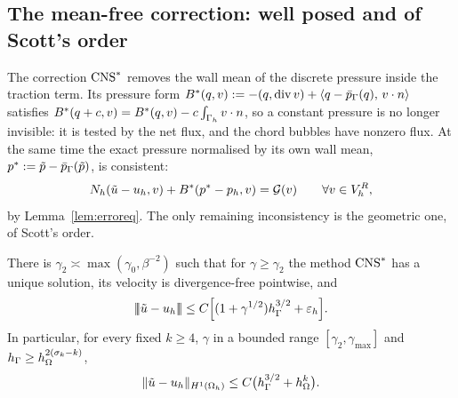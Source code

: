 \subsection{The mean-free correction: well posed and of Scott's order}
The correction $\mathrm{CNS}^\ast$ removes the wall mean of the discrete pressure inside the traction term. Its pressure form $B^\ast(q,v):=-(q,\operatorname{div} v)+\langle q-\bar p_{\Gamma}(q),\, v\cdot n\rangle$ satisfies $B^\ast(q+c,v)=B^\ast(q,v)-c\int_{\Gamma_h}v\cdot n$, so a constant pressure is no longer invisible: it is tested by the net flux, and the chord bubbles have nonzero flux. At the same time the exact pressure normalised by its own wall mean, $p^\ast:=\tilde p-\bar p_{\Gamma}(\tilde p)$, is consistent:
\begin{equation}\label{eq:cnserr}
N_h(\tilde u-u_h,v)+B^\ast(p^\ast-p_h,v)=\mathcal G(v)\qquad\forall v\in V_h^R ,
\end{equation}
by Lemma~\ref{lem:erroreq}. The only remaining inconsistency is the geometric one, of Scott's order.

\begin{theorem}\label{thm:D}
There is $\gamma_2\asymp\max(\gamma_0,\beta^{-2})$ such that for $\gamma\ge\gamma_2$ the method $\mathrm{CNS}^\ast$ has a unique solution, its velocity is divergence-free pointwise, and
\[
|\!|\!|\tilde u-u_h|\!|\!|\le C\Bigl[(1+\gamma^{1/2})h_\Gamma^{3/2}+\varepsilon_h\Bigr].
\]
In particular, for every fixed $k\ge4$, $\gamma$ in a bounded range $[\gamma_2,\gamma_{\max}]$ and $h_\Gamma\ge h_\Omega^{2(\sigma_k-k)}$,
\[
\lVert \tilde u-u_h\rVert_{H^1(\Omega_h)}\le C\bigl(h_\Gamma^{3/2}+h_\Omega^{k}\bigr).
\]
\end{theorem}

